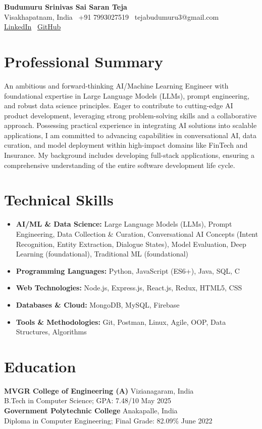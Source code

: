 \documentclass[11pt]{article}
\newcommand{\contactinfo}[4]{%
  \begin{center}
    \fontsize{18pt}{20pt}\selectfont\textbf{#1}\\[5pt]
    \fontsize{10pt}{12pt}\selectfont #2 \textbar\ #3 \textbar\ #4 \\[2pt]
    \fontsize{10pt}{12pt}\selectfont \href{https://linkedin.com/in/budumuru-srinivas-sai-saran-teja-31744b216}{LinkedIn} \textbar\ \href{https://github.com/SaranTejaB}{GitHub}
  \end{center}
}
\begin{document}
\contactinfo{Budumuru Srinivas Sai Saran Teja}{Visakhapatnam, India}{+91 7993027519}{tejabudumuru3@gmail.com}

\section*{Professional Summary}
An ambitious and forward-thinking AI/Machine Learning Engineer with foundational expertise in Large Language Models (LLMs), prompt engineering, and robust data science principles. Eager to contribute to cutting-edge AI product development, leveraging strong problem-solving skills and a collaborative approach. Possessing practical experience in integrating AI solutions into scalable applications, I am committed to advancing capabilities in conversational AI, data curation, and model deployment within high-impact domains like FinTech and Insurance. My background includes developing full-stack applications, ensuring a comprehensive understanding of the entire software development life cycle.

\section*{Technical Skills}
\begin{itemize}[leftmargin=*,label=\textbullet]
    \item \textbf{AI/ML \& Data Science:} Large Language Models (LLMs), Prompt Engineering, Data Collection \& Curation, Conversational AI Concepts (Intent Recognition, Entity Extraction, Dialogue States), Model Evaluation, Deep Learning (foundational), Traditional ML (foundational)
    \item \textbf{Programming Languages:} Python, JavaScript (ES6+), Java, SQL, C
    \item \textbf{Web Technologies:} Node.js, Express.js, React.js, Redux, HTML5, CSS
    \item \textbf{Databases \& Cloud:} MongoDB, MySQL, Firebase
    \item \textbf{Tools \& Methodologies:} Git, Postman, Linux, Agile, OOP, Data Structures, Algorithms
\end{itemize}

\section*{Education}
\textbf{MVGR College of Engineering (A)} \hfill Vizianagaram, India \\
B.Tech in Computer Science; GPA: 7.48/10 \hfill May 2025 \\
\textbf{Government Polytechnic College} \hfill Anakapalle, India \\
Diploma in Computer Engineering; Final Grade: 82.09\% \hfill June 2022
\end{document}
